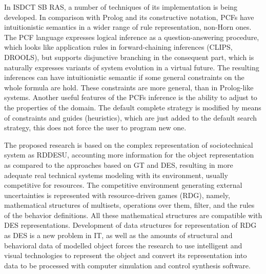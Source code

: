 \documentclass[runningheads]{llncs}
\begin{document}
In ISDCT SB RAS, a number of techniques of its implementation is being developed. In comparison with Prolog and its constructive notation, PCFs have intuitionistic semantics in a wider range of rule representation, non-Horn ones. The PCF language expresses logical inference as a question-answering procedure, which looks like application rules in forward-chaining inferences (CLIPS, DROOLS), but supports disjunctive branching in the consequent part, which is naturally expresses variants of system evolution in a virtual future. The resulting inferences can have intuitionistic semantic if some general constraints on the whole formula are hold. These constraints are more general, than in Prolog-like systems. Another useful features of the PCFs inference is the ability to adjust to the properties of the domain. The default complete strategy is modified by means of constraints and guides (heuristics), which are just added to the default search strategy, this does not force the user to program new one.

The proposed research is based on the complex representation of sociotechnical system as RDDESU, accounting more information for the object representation as compared to the approaches based on GT and DES, resulting in more adequate real technical systems modeling with its environment, usually competitive for resources. The competitive environment generating external uncertainties is represented with resource-driven games (RDG), namely, mathematical structures of multisets, operations over them, filter, and the rules of the behavior definitions.  All these mathematical structures are compatible with DES representations. Development of data structures for representation of RDG as DES is a new problem in IT, as well as the amounts of structural and behavioral data of modelled object forces the research to use intelligent and visual technologies to represent the object and convert its representation into data to be processed with computer simulation and control synthesis software.

\end{document}
